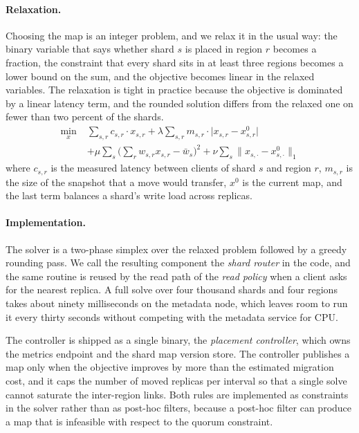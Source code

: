 ﻿\documentclass[10pt,twocolumn,letterpaper]{article}
\begin{document}
\paragraph{Relaxation.}
Choosing the map is an integer problem, and we relax it in the usual way: the binary
variable that says whether shard $s$ is placed in region $r$ becomes a fraction, the
constraint that every shard sits in at least three regions becomes a lower bound on the
sum, and the objective becomes linear in the relaxed variables. The relaxation is tight
in practice because the objective is dominated by a linear latency term, and the rounded
solution differs from the relaxed one on fewer than two percent of the shards.
\begin{equation}
\begin{aligned}
\min_{x} \;& \sum_{s,r} c_{s,r} \cdot x_{s,r}
          + \lambda \sum_{s,r} m_{s,r} \cdot \lvert x_{s,r} - x^{0}_{s,r} \rvert \\
        & + \mu \sum_{s} \Big( \sum_{r} w_{s,r} x_{s,r} - \bar{w}_{s} \Big)^{2}
          + \nu \sum_{s} \big\lVert x_{s,\cdot} - x^{0}_{s,\cdot} \big\rVert_{1}
\end{aligned}
\end{equation}
where $c_{s,r}$ is the measured latency between clients of shard $s$ and region $r$,
$m_{s,r}$ is the size of the snapshot that a move would transfer, $x^{0}$ is the current
map, and the last term balances a shard's write load across replicas.

\paragraph{Implementation.}
The solver is a two-phase simplex over the relaxed problem followed by a greedy rounding
pass. We call the resulting component the \emph{shard router} in the code, and the same
routine is reused by the read path of the \emph{read policy} when a client asks for the
nearest replica. A full solve over four thousand shards and four regions takes about
ninety milliseconds on the metadata node, which leaves room to run it every thirty
seconds without competing with the metadata service for CPU.

The controller is shipped as a single binary, the \emph{placement controller}, which owns the metrics endpoint and the shard map version store. The controller publishes a map only when the objective improves by more than the
estimated migration cost, and it caps the number of moved replicas per interval so that
a single solve cannot saturate the inter-region links. Both rules are implemented as
constraints in the solver rather than as post-hoc filters, because a post-hoc filter can
produce a map that is infeasible with respect to the quorum constraint.
\end{document}
